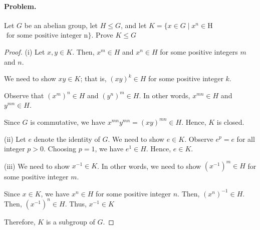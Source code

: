 \documentclass{article}
\begin{document}
\paragraph{Problem.} Let $G$ be an abelian group, let $H \le G$, and
let $K=\{x \in G \mid x^n \in $H$ \text{ for some positive integer } $n$\}$.
Prove $K \le G$
\begin{proof}
(i) Let $x,y \in K$. Then, $x^m \in H$ and $x^n \in H$ for some positive
integers $m$ and $n$.

We need to show $xy \in K$; that is, $(xy)^k \in H$ for
some positive integer $k$.

Observe that $(x^m)^n \in H$ and $(y^n)^m \in H$. In other words,
$x^{mn} \in H$ and $y^{mn} \in H$.

Since $G$ is commutative, we have $x^{mn}y^{mn}=(xy)^{mn} \in H$. Hence,
$K$ is closed.

(ii) Let $e$ denote the identity of $G$. We need to show $e \in K$.
Observe $e^p=e$ for all integer $p>0$. Choosing $p=1$, we have $e^1 \in H$.
Hence, $e \in K$.

(iii) We need to show $x^{-1} \in K$. In other words, we need to show
$(x^{-1})^m \in H$ for some positive integer $m$.

Since $x \in K$, we have $x^n \in H$ for some positive integer $n$. Then,
$(x^n)^{-1} \in H$. Then, $(x^{-1})^n \in H$. Thus, $x^{-1} \in K$

Therefore, $K$ is a subgroup of $G$.
\end{proof}
\end{document}
